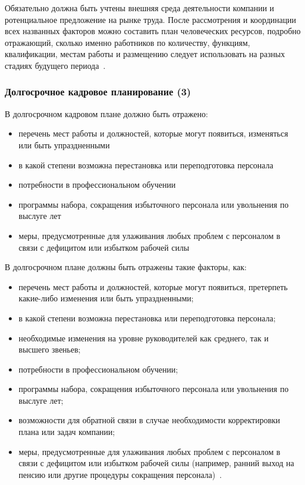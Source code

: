 \documentclass{../industrial-development}
\begin{document}
\lecturenotes

Обязательно должна быть учтены внешняя среда деятельности компании и ротенциальное предложение на рынке труда. После рассмотрения и координации всех названных факторов можно составить план человеческих ресурсов, подробно отражающий, сколько именно работников по количеству, функциям, квалификации, местам работы и размещению следует использовать на разных стадиях будущего периода~\cite[с.~86]{Ivanova}.

\begin{frame} \frametitle{Долгосрочное кадровое планирование (3)}
	
	В долгосрочном кадровом плане должно быть отражено:
	\begin{itemize}
		\item	перечень мест работы и должностей, которые могут появиться, изменяться или быть упраздненными
		\item	в какой степени возможна перестановка или переподготовка персонала
		\item	потребности в профессиональном обучении
		\item	программы набора, сокращения избыточного персонала или увольнения по выслуге лет
		\item меры, предусмотренные для улаживания любых проблем с персоналом в связи с дефицитом или избытком рабочей силы 
	\end{itemize}
\end{frame}

\lecturenotes

В долгосрочном плане должны быть отражены такие факторы, как:
\begin{itemize}
	\item перечень мест работы и должностей, которые могут появиться, претерпеть какие-либо изменения или быть упраздненными;
	
	\item в какой степени возможна перестановка или переподготовка персонала;
	
	\item необходимые изменения на уровне руководителей как среднего, так и высшего звеньев;
	
	\item потребности в профессиональном обучении;
	
	\item программы набора, сокращения избыточного персонала или увольнения по выслуге лет;
	
	\item возможности для обратной связи в случае необходимости корректировки плана или задач компании;
	
	\item меры, предусмотренные для улаживания любых проблем с персоналом в связи с дефицитом или избытком рабочей силы (например, ранний выход на пенсию или другие процедуры сокращения персонала)~\cite[с.~86--87]{Ivanova}.
\end{itemize}
\end{document}
